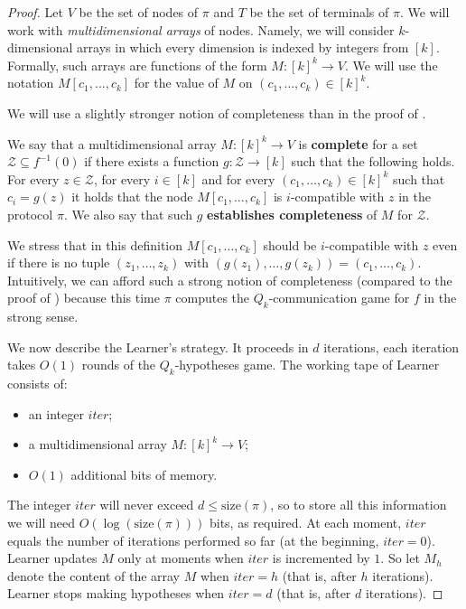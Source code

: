 \begin{proof}
Let $V$ be the set of nodes of $\pi$ and $T$ be the set of terminals of $\pi$.  We will work with \emph{multidimensional arrays} of nodes. Namely, we will consider $k$-dimensional arrays in which every dimension is indexed by integers from $[k]$. Formally, such arrays are functions of the form $M\colon [k]^k\to V$. We will use the notation $M[c_1, \ldots, c_k]$ for the value of $M$ on $(c_1, \ldots, c_k) \in [k]^k$.

We will use a slightly stronger notion of completeness than in the proof of .

\begin{definition}
 We say that a multidimensional array $M\colon [k]^k \to V$ is \textbf{complete} for a set $\mathcal{Z}\subseteq f^{-1}(0)$ if there exists a function $g\colon\mathcal{Z} \to [k]$ such that the following holds. For every $z\in \mathcal{Z}$, for every $i\in [k]$ and for every $(c_1, \ldots, c_k)\in [k]^k$ such that $c_i = g(z)$ it holds that the node $M[c_1, \ldots, c_k]$ is $i$-compatible with $z$ in the protocol $\pi$. We also say that such $g$ \textbf{establishes completeness} of $M$ for $\mathcal{Z}$.
\end{definition}

We stress that in this definition $M[c_1, \ldots, c_k]$ should be $i$-compatible with $z$ even if there is no tuple $(z_1, \ldots, z_k)$ with $(g(z_1), \ldots, g(z_k)) = (c_1, \ldots, c_k)$. Intuitively, we can afford such a strong notion of completeness (compared to the proof of ) because this time $\pi$ computes the $Q_k$-communication game for $f$ in the strong sense.

We now describe the Learner's strategy. It proceeds in $d$ iterations, each iteration takes $O(1)$ rounds of the $Q_k$-hypotheses game. The working tape of Learner consists of:
\begin{itemize}
\item an integer $iter$;
\item a multidimensional array $M\colon [k]^k \to V$;
\item $O(1)$ additional bits of memory. 
\end{itemize}
The integer $iter$ will never exceed $d\le \mathrm{size}(\pi)$, so to store all this information we will need $O(\log (\mathrm{size}(\pi)))$ bits, as required. At each moment, $iter$ equals the number of iterations performed so far (at the beginning, $iter = 0$). Learner updates $M$ only at moments when $iter$ is incremented by $1$. So let $M_h$ denote the content of the array $M$ when $iter = h$ (that is, after $h$ iterations). Learner stops making hypotheses when $iter = d$ (that is, after $d$ iterations).


\end{proof}
